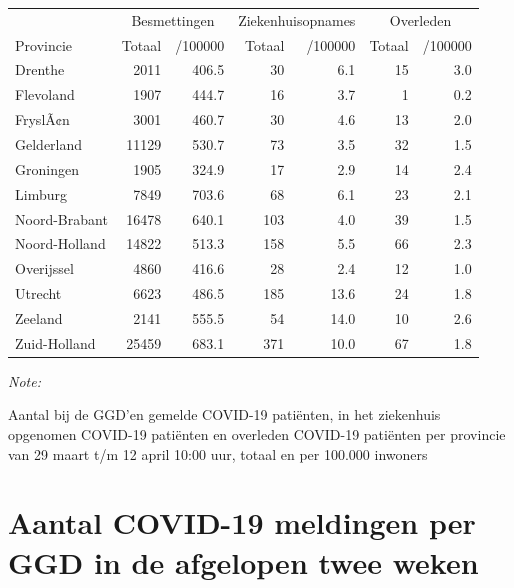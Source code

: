 \documentclass[
  english,
  man,floatsintext]{apa6}
\begin{document}
\begin{table}
\centering
\begin{threeparttable}
\begin{tabular}{lrrrrrr}
\toprule
\multicolumn{1}{c}{ } & \multicolumn{2}{c}{Besmettingen} & \multicolumn{2}{c}{Ziekenhuisopnames} & \multicolumn{2}{c}{Overleden} \\
\cmidrule(l{3pt}r{3pt}){2-3} \cmidrule(l{3pt}r{3pt}){4-5} \cmidrule(l{3pt}r{3pt}){6-7}
Provincie & Totaal & /100000 & Totaal & /100000 & Totaal & /100000\\
\midrule
Drenthe & 2011 & 406.5 & 30 & 6.1 & 15 & 3.0\\
Flevoland & 1907 & 444.7 & 16 & 3.7 & 1 & 0.2\\
FryslÃ¢n & 3001 & 460.7 & 30 & 4.6 & 13 & 2.0\\
Gelderland & 11129 & 530.7 & 73 & 3.5 & 32 & 1.5\\
Groningen & 1905 & 324.9 & 17 & 2.9 & 14 & 2.4\\
Limburg & 7849 & 703.6 & 68 & 6.1 & 23 & 2.1\\
Noord-Brabant & 16478 & 640.1 & 103 & 4.0 & 39 & 1.5\\
Noord-Holland & 14822 & 513.3 & 158 & 5.5 & 66 & 2.3\\
Overijssel & 4860 & 416.6 & 28 & 2.4 & 12 & 1.0\\
Utrecht & 6623 & 486.5 & 185 & 13.6 & 24 & 1.8\\
Zeeland & 2141 & 555.5 & 54 & 14.0 & 10 & 2.6\\
Zuid-Holland & 25459 & 683.1 & 371 & 10.0 & 67 & 1.8\\
\bottomrule
\end{tabular}
\begin{tablenotes}
\item \textit{Note: } 
\item Aantal bij de GGD’en gemelde COVID-19 patiënten, in het ziekenhuis opgenomen COVID-19 patiënten en overleden COVID-19 patiënten per provincie van 29 maart t/m 12 april 10:00 uur, totaal en per 100.000 inwoners
\end{tablenotes}
\end{threeparttable}
\end{table}

\newpage

\hypertarget{aantal-covid-19-meldingen-per-ggd-in-de-afgelopen-twee-weken}{%
\section{Aantal COVID-19 meldingen per GGD in de afgelopen twee weken}\label{aantal-covid-19-meldingen-per-ggd-in-de-afgelopen-twee-weken}}
\end{document}
